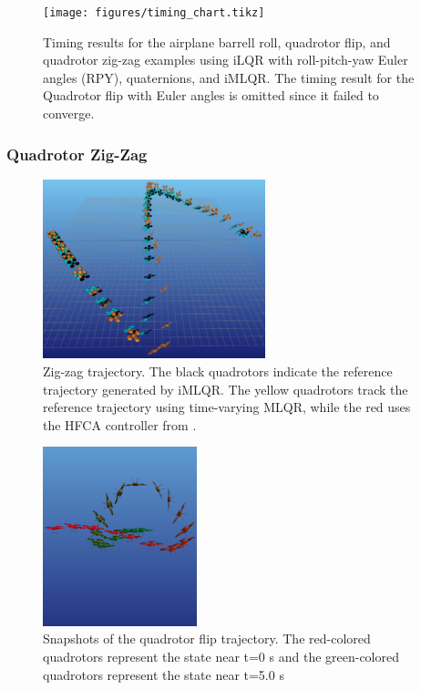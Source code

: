 \documentclass[letterpaper, 10 pt, conference]{ieeeconf}  %
\begin{document}
        \begin{figure}
            \centering
            \texttt{[image: figures/timing\_chart.tikz]}
            \caption{Timing results for the airplane barrell roll, quadrotor
                flip, and quadrotor zig-zag examples using iLQR with
                roll-pitch-yaw Euler angles (RPY), quaternions, and iMLQR. The
                timing result for the Quadrotor flip with Euler angles is omitted
                since it failed to converge.
            }
            \label{fig:timing_chart}
        \end{figure}

        \subsubsection{Quadrotor Zig-Zag}
            \begin{figure}[t]
                \centering
                \includegraphics[height=5.2cm]{figures/zig_zag_tracking.png}
                \caption{Zig-zag trajectory. The black quadrotors indicate
                    the reference trajectory generated by iMLQR. The yellow
                    quadrotors track the reference trajectory using time-varying
                    MLQR, while the red uses the HFCA controller from
                    \cite{watterson2020control}.
                }
                \label{fig:zig-zag}
            \end{figure}    
            \begin{figure}[t]
                \centering
                \includegraphics[height=5.2cm,trim={0 3cm 0 0},clip]{figures/quad_flip.png}
                \caption{Snapshots of the quadrotor flip trajectory. The
                    red-colored quadrotors represent the state near t=0 s and the
                    green-colored quadrotors represent the state near t=5.0 s
                }
                \label{fig:quad_flip}
            \end{figure}    
            
\end{document}
